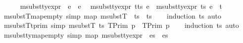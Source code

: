 \begin{isabellebody}
\ \ \isanewline
\ \ \ {\isachardoublequoteopen}msubst{\isacharunderscore}{\kern0pt}ty{\isacharunderscore}{\kern0pt}expr\ {\isacharbrackleft}{\kern0pt}{\isacharbrackright}{\kern0pt}\ e\ {\isacharequal}{\kern0pt}\ e{\isachardoublequoteclose}\isanewline
\ {\isacharbar}{\kern0pt}\ {\isachardoublequoteopen}msubst{\isacharunderscore}{\kern0pt}ty{\isacharunderscore}{\kern0pt}expr\ {\isacharparenleft}{\kern0pt}t{\isacharhash}{\kern0pt}ts{\isacharparenright}{\kern0pt}\ e\ {\isacharequal}{\kern0pt}\ msubst{\isacharunderscore}{\kern0pt}ty{\isacharunderscore}{\kern0pt}expr\ ts\ {\isacharparenleft}{\kern0pt}e{\isacharbrackleft}{\kern0pt}{}\ {\isasymmapsto}\isactrlsub {\isasymtau}\ t{\isacharbrackright}{\kern0pt}{\isacharparenright}{\kern0pt}{\isachardoublequoteclose}\isanewline
\isanewline
\isanewline
\isanewline
\isanewline
{}\isamarkupfalse%
\ msubstT{\isacharunderscore}{\kern0pt}map{\isacharunderscore}{\kern0pt}empty\ {\isacharbrackleft}{\kern0pt}simp{\isacharbrackright}{\kern0pt}{\isacharcolon}{\kern0pt}\ {\isachardoublequoteopen}map\ {\isacharparenleft}{\kern0pt}msubstT\ {\isacharbrackleft}{\kern0pt}{\isacharbrackright}{\kern0pt}{\isacharparenright}{\kern0pt}\ ts\ {\isacharequal}{\kern0pt}\ ts{\isachardoublequoteclose}\isanewline
%
\isadelimproof
\ \ %
\endisadelimproof
%
\isatagproof
{}\isamarkupfalse%
\ {\isacharparenleft}{\kern0pt}induction\ ts{\isacharsemicolon}{\kern0pt}\ auto{\isacharparenright}{\kern0pt}%
\endisatagproof
{\isafoldproof}%
%
\isadelimproof
\isanewline
%
\endisadelimproof
\isanewline
{}\isamarkupfalse%
\ msubstT{\isacharunderscore}{\kern0pt}tprim\ {\isacharbrackleft}{\kern0pt}simp{\isacharbrackright}{\kern0pt}{\isacharcolon}{\kern0pt}\ {\isachardoublequoteopen}msubstT\ ts\ {\isacharparenleft}{\kern0pt}TPrim\ p{\isacharparenright}{\kern0pt}\ {\isacharequal}{\kern0pt}\ {\isacharparenleft}{\kern0pt}TPrim\ p{\isacharparenright}{\kern0pt}{\isachardoublequoteclose}\isanewline
%
\isadelimproof
\ \ %
\endisadelimproof
%
\isatagproof
{}\isamarkupfalse%
\ {\isacharparenleft}{\kern0pt}induction\ ts{\isacharsemicolon}{\kern0pt}\ auto{\isacharparenright}{\kern0pt}%
\endisatagproof
{\isafoldproof}%
%
\isadelimproof
\isanewline
%
\endisadelimproof
\isanewline
{}\isamarkupfalse%
\ msubst{\isacharunderscore}{\kern0pt}ty{\isacharunderscore}{\kern0pt}map{\isacharunderscore}{\kern0pt}empty\ {\isacharbrackleft}{\kern0pt}simp{\isacharbrackright}{\kern0pt}{\isacharcolon}{\kern0pt}\ {\isachardoublequoteopen}map\ {\isacharparenleft}{\kern0pt}msubst{\isacharunderscore}{\kern0pt}ty{\isacharunderscore}{\kern0pt}expr\ {\isacharbrackleft}{\kern0pt}{\isacharbrackright}{\kern0pt}{\isacharparenright}{\kern0pt}\ es\ {\isacharequal}{\kern0pt}\ es{\isachardoublequoteclose}\isanewline

\end{isabellebody}
